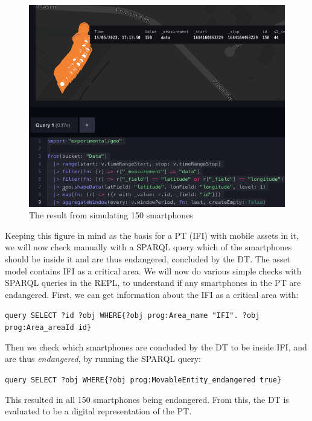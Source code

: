 \documentclass{article}
\begin{document}
\begin{figure}[H]
    \centering
    \includegraphics[scale=0.42]{graphics/150_smartphones.png}
    \caption{The result from simulating 150 smartphones}
    \label{fig:150_smartphones}
\end{figure}

Keeping this figure in mind as the basis for a PT (IFI) with mobile assets in it, we will now check manually with a SPARQL query which of the smartphones should be inside it and are thus endangered, concluded by the DT. The asset model contains IFI as a critical area.
We will now do various simple checks with SPARQL queries in the REPL, to understand if any smartphones in the PT are endangered. First, we can get information about the IFI as a critical area with:
\newline
\begin{small}
\verb|query SELECT ?id ?obj WHERE{?obj prog:Area_name "IFI". ?obj prog:Area_areaId id}| 
\end{small}

Then we check which smartphones are concluded by the DT to be inside IFI, and are thus \emph{endangered}, by running the SPARQL query:
\newline
\begin{small}
\verb|query SELECT ?obj WHERE{?obj prog:MovableEntity_endangered true}|
\end{small}

This resulted in all 150 smartphones being endangered. From this, the DT is evaluated to be a digital representation of the PT.
\end{document}
